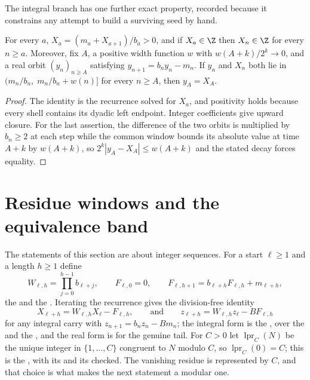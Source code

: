 \documentclass[11pt]{article}
\newcommand{\lpr}{\operatorname{lpr}}
\begin{document}
The integral branch has one further exact property, recorded because it
constrains any attempt to build a surviving seed by hand.

\begin{proposition}\label{long269:res:pinning}
For every $a$, $X_a=(m_a+X_{a+1})/b_a>0$, and if $X_a\in\Z$ then $X_n\in\Z$ for
every $n\ge a$.  Moreover, fix $A$, a positive width function $w$ with
$w(A+k)/2^{k}\to0$, and a real orbit $(y_n)_{n\ge A}$ satisfying
$y_{n+1}=b_ny_n-m_n$.  If $y_n$ and $X_n$ both lie in
$(m_n/b_n,\;m_n/b_n+w(n)]$ for every $n\ge A$, then $y_A=X_A$.
\end{proposition}

\begin{proof}
The identity is the recurrence solved for $X_a$, and positivity holds because
every shell contains its dyadic left endpoint.  Integer coefficients give
upward closure.  For the last assertion, the difference of the two orbits is
multiplied by $b_n\ge2$ at each step while the common window bounds its
absolute value at time $A+k$ by $w(A+k)$, so $2^{k}|y_A-X_A|\le w(A+k)$ and the
stated decay forces equality.
\end{proof}

\section{Residue windows and the equivalence band}\label{long269:sec:escape}

The statements of this section are about integer sequences.  For a start
$\ell\ge1$ and a length $h\ge1$ define
\[
 W_{\ell,h}=\prod_{j=0}^{h-1}b_{\ell+j},
 \qquad
 F_{\ell,0}=0,
 \qquad
 F_{\ell,h+1}=b_{\ell+h}F_{\ell,h}+m_{\ell+h},
\]
the
 and the
.
Iterating the recurrence gives the division-free identity
\begin{equation}\label{long269:eq:window-identity}
 X_{\ell+h}=W_{\ell,h}X_\ell-F_{\ell,h},
 \qquad\text{and}\qquad
 z_{\ell+h}=W_{\ell,h}z_\ell-BF_{\ell,h}
\end{equation}
for any integral carry with $z_{n+1}=b_nz_n-Bm_n$; the integral form is the
, over the
 and the
, and the real form is
for the genuine tail.  For $C>0$ let $\lpr_C(N)$ be the unique integer in
$\{1,\ldots,C\}$ congruent to $N$ modulo $C$, so $\lpr_C(0)=C$; this is the
, with its
 and
its
checked.  The vanishing residue is represented by $C$, and that choice is what
makes the next statement a modular one.
\end{document}
